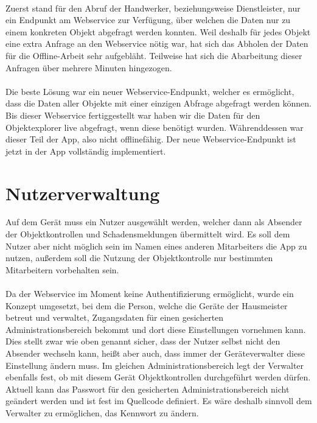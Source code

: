 \documentclass[12pt]{article}
\begin{document}
\paragraph{}Zuerst stand für den Abruf der Handwerker, beziehungsweise Dienstleister, nur ein Endpunkt am Webservice zur Verfügung, über welchen die Daten nur zu einem konkreten Objekt abgefragt werden konnten. Weil deshalb für jedes Objekt eine extra Anfrage an den Webservice nötig war, hat sich das Abholen der Daten für die Offline-Arbeit sehr aufgebläht. Teilweise hat sich die Abarbeitung dieser Anfragen über mehrere Minuten hingezogen.

\paragraph{}Die beste Lösung war ein neuer Webservice-Endpunkt, welcher es ermöglicht, dass die Daten aller Objekte mit einer einzigen Abfrage abgefragt werden können. Bis dieser Webservice fertiggestellt war haben wir die Daten für den Objektexplorer live abgefragt, wenn diese benötigt wurden. Währenddessen war dieser Teil der App, also nicht offlinefähig. Der neue Webservice-Endpunkt ist jetzt in der App vollständig implementiert.

\section{Nutzerverwaltung}
Auf dem Gerät muss ein Nutzer ausgewählt werden, welcher dann als Absender der Objektkontrollen und Schadensmeldungen übermittelt wird. Es soll dem Nutzer aber nicht möglich sein im Namen eines anderen Mitarbeiters die App zu nutzen, außerdem soll die Nutzung der Objektkontrolle nur bestimmten Mitarbeitern vorbehalten sein.

\paragraph{}Da der Webservice im Moment keine Authentifizierung ermöglicht, wurde ein Konzept umgesetzt, bei dem die Person, welche die Geräte der Hausmeister betreut und verwaltet, Zugangsdaten für einen gesicherten Administrationsbereich bekommt und dort diese Einstellungen vornehmen kann. Dies stellt zwar wie oben genannt sicher, dass der Nutzer selbst nicht den Absender wechseln kann, heißt aber auch, dass immer der Geräteverwalter diese Einstellung ändern muss. Im gleichen Administrationsbereich legt der Verwalter ebenfalls fest, ob mit diesem Gerät Objektkontrollen durchgeführt werden dürfen. Aktuell kann das Passwort für den gesicherten Administrationsbereich nicht geändert werden und ist fest im Quellcode definiert. Es wäre deshalb sinnvoll dem Verwalter zu ermöglichen, das Kennwort zu ändern.
\end{document}
